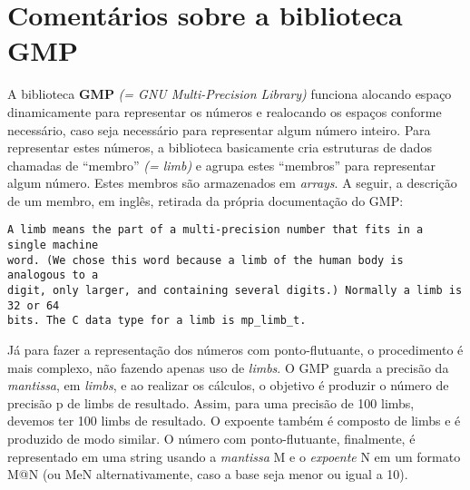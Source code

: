 \documentclass[11pt]{article}
\newcommand{\quotes}[1]{``#1''}
\begin{document}
\section{Comentários sobre a biblioteca GMP}

A biblioteca \textbf{GMP} \textit{(= GNU Multi-Precision Library)} funciona alocando espaço dinamicamente para representar os números e realocando os espaços conforme necessário, caso seja necessário para representar algum número inteiro.
Para representar estes números, a biblioteca basicamente cria estruturas de dados chamadas de \quotes{membro} \textit{(= limb)} e agrupa estes \quotes{membros} para representar algum número. Estes membros são armazenados em \textit{arrays}.
A seguir, a descrição de um membro, em inglês, retirada da própria documentação do GMP:
\begin{verbatim}
A limb means the part of a multi-precision number that fits in a single machine 
word. (We chose this word because a limb of the human body is analogous to a 
digit, only larger, and containing several digits.) Normally a limb is 32 or 64 
bits. The C data type for a limb is mp_limb_t.
\end{verbatim}
Já para fazer a representação dos números com ponto-flutuante, o procedimento é mais complexo, não fazendo apenas uso de \textit{limbs}.
O GMP guarda a precisão da \textit{mantissa}, em \textit{limbs}, e ao realizar os cálculos, o objetivo é produzir o número de precisão p de limbs de resultado. Assim, para uma precisão de 100 limbs, devemos ter 100 limbs de resultado.
O expoente também é composto de limbs e é produzido de modo similar. O número com ponto-flutuante, finalmente, é representado em uma string usando a \textit{mantissa} M e o \textit{expoente} N em um formato M@N (ou MeN alternativamente, caso a base seja menor ou igual a 10).
\end{document}
